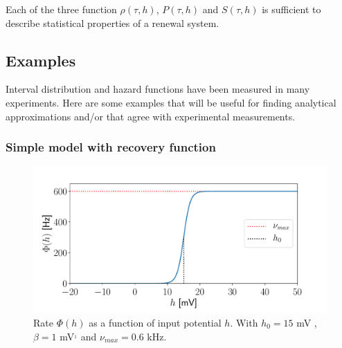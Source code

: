 \documentclass[12pt,twoside]{report}
\begin{document}
Each of the three function $\rho(\tau,h)$, $P(\tau,h)$ and $S(\tau,h)$ is sufficient to describe statistical properties of a renewal system.

\subsection{Examples }

Interval distribution and hazard functions have been measured in many experiments. Here are some examples that will be useful for finding analytical approximations and/or that agree  with experimental measurements.

\subsubsection{Simple model with recovery function}

\begin{figure}[h!]
	\centering
	\includegraphics[width=0.8\linewidth]{phi_h.pdf}
	\caption{ Rate $\Phi(h)$ as a function of input potential $h$. With $h_0=15$ mV , $\beta=1$ mV$^{_1}$ and $\nu_{max}=0.6$ kHz.}
	\label{fig:phi_h}
\end{figure}
\end{document}
